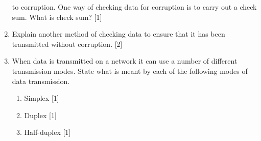 \begin{enumerate}
to corruption. One way of checking data for corruption is to carry
out a check sum. What is check sum? \hfill{}{[}1{]}
\item Explain another method of checking data to ensure that it has been
transmitted without corruption. \hfill{}{[}2{]}
\item When data is transmitted on a network it can use a number of different
transmission modes. State what is meant by each of the following modes
of data transmission.
\begin{enumerate}
\item Simplex \hfill{}{[}1{]}
\item Duplex \hfill{}{[}1{]}
\item Half-duplex \hfill{} {[}1{]}
\end{enumerate}
\end{enumerate}